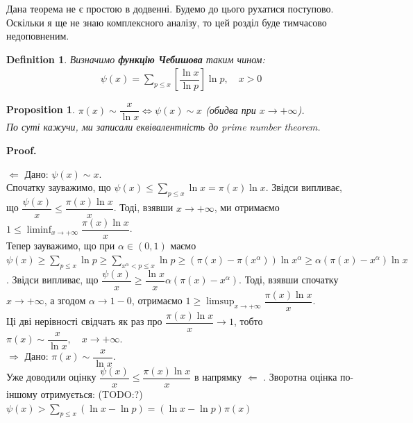 \documentclass[a4paper, 10pt]{article}
\makeatletter
\theoremstyle{theoremdd}
\theoremstyle{theoremdd}
\newtheorem{definition}[theorem]{Definition}
\theoremstyle{theoremdd}
\theoremstyle{theoremdd}
\theoremstyle{theoremdd}
\newtheorem{proposition}[theorem]{Proposition}
\theoremstyle{theoremdd}
\theoremstyle{theoremdd}
\theoremstyle{theoremdd}
\def\rightproof{$\boxed{\Rightarrow}$ }
\def\leftproof{$\boxed{\Leftarrow}$ }
\renewenvironment{proof}[1][Proof.\\]{\par
\pushQED{\hfill \qed}%
\normalfont \topsep6\p@\@plus6\p@\relax
\trivlist
\item\relax
{\bfseries
#1\@addpunct{.}}\hspace\labelsep\ignorespaces
}{%
\popQED\endtrivlist\@endpefalse
}
\makeatother
\begin{document}
Дана теорема не є простою в додвенні. Будемо до цього рухатися поступово. Оскільки я ще не знаю комплексного аналізу, то цей розділ буде тимчасово недоповненим.

\begin{definition}
Визначимо \textbf{функцію Чебишова} таким чином:
\begin{align*}
\psi(x) = \sum_{p \leq x} \left[ \dfrac{\ln x}{\ln p} \right] \ln p, \quad x > 0
\end{align*}
\end{definition}

\begin{proposition}
$\pi(x) \sim \dfrac{x}{\ln x} \iff \psi(x) \sim x$ (обидва при $x \to +\infty$).\\
По суті кажучи, ми записали еквівалентність до prime number theorem.
\end{proposition}

\begin{proof}
\leftproof Дано: $\psi(x) \sim x$.\\
Спочатку зауважимо, що $\psi(x) \leq \displaystyle\sum_{p \leq x} \ln x = \pi(x) \ln x$. Звідси випливає, що $\dfrac{\psi(x)}{x} \leq \dfrac{\pi(x) \ln x}{x}$. Тоді, взявши $x \to +\infty$, ми отримаємо $1 \leq \displaystyle\liminf_{x \to +\infty} \dfrac{\pi(x) \ln x}{x}$.\\
Тепер зауважимо, що при $\alpha \in (0,1)$ маємо $\psi(x) \geq \displaystyle\sum_{p \leq x} \ln p \geq \sum_{x^\alpha < p \leq x} \ln p \geq (\pi(x) - \pi(x^\alpha)) \ln x^\alpha \geq \alpha(\pi(x) - x^\alpha) \ln x$. Звідси випливає, що $\dfrac{\psi(x)}{x} \geq \dfrac{\ln x}{x} \alpha (\pi(x) - x^\alpha)$. Тоді, взявши спочатку $x \to +\infty$, а згодом $\alpha \to 1-0$, отримаємо $1 \geq \displaystyle\limsup_{x \to +\infty} \dfrac{\pi(x) \ln x}{x}$.\\
Ці дві нерівності свідчать як раз про $\dfrac{\pi(x) \ln x}{x} \to 1$, тобто $\pi(x) \sim \dfrac{x}{\ln x}, \quad x \to +\infty$.
\bigskip \\
\rightproof Дано: $\pi(x) \sim \dfrac{x}{\ln x}$.\\
Уже доводили оцінку $\dfrac{\psi(x)}{x} \leq \dfrac{\pi(x) \ln x}{x}$ в напрямку \leftproof. Зворотна оцінка по-іншому отримується: (TODO:?)\\
$\psi(x) > \displaystyle\sum_{p \leq x} (\ln x - \ln p) = (\ln x - \ln p) \pi(x)$ 
\end{proof}



\newpage
\end{document}
